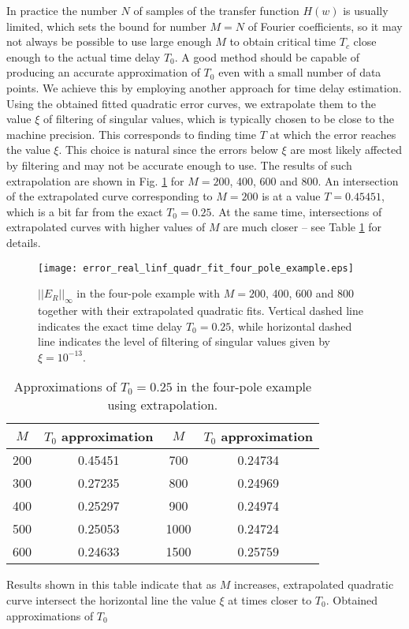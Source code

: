 \documentclass[journal,twoside]{IEEEtran}
\begin{document}
In practice the number $N$ of samples of the transfer function $H(w)$ is usually limited, which sets the bound for number $M=N$ of Fourier coefficients, so it may not always be possible to use large enough $M$ to obtain critical time $T_c$ close enough to the actual time delay $T_0$. A good method should be capable of producing an accurate approximation of $T_0$ even with a small number of data points. We achieve this by employing another approach for time delay estimation. Using the obtained   fitted quadratic error curves, we extrapolate them  to the value $\xi$ of filtering of singular values, which is typically chosen to be close to the machine precision. This corresponds to finding time $T$ at which the error reaches the value $\xi$. This choice is natural since the errors below $\xi$ are most likely affected by filtering and may not be accurate enough to use. The results of such extrapolation are shown in Fig. \ref{Ffour_pole3} for   $M=200$, 400, 600 and 800. An intersection of the extrapolated curve corresponding to $M=200$ is at a value $T=0.45451$, which is a bit far from the exact $T_0=0.25$. At the same time, intersections of extrapolated curves with higher values of $M$ are  much closer -- see  Table \ref{T0_extrapol_four_pole} for details. 
\begin{figure}[h] \begin{center}
\texttt{[image: error\_real\_linf\_quadr\_fit\_four\_pole\_example.eps]}
\end{center}
\caption{$||E_R||_\infty$ in the four-pole example with $M=200$, 400, 600 and 800  together with their extrapolated quadratic fits. Vertical dashed line indicates the exact time delay $T_0=0.25$, while horizontal dashed line indicates the level of filtering of singular values given by $\xi=10^{-13}$.}
\label{Ffour_pole3}
\end{figure}
\begin{table}[h]
\begin{center}
\begin{tabular}{|c|c||c|c|}
\hline
\rule{0cm}{10pt}
$M$ & $T_0$ approximation & $M$ & $T_0$ approximation  \\[3pt]
\hline
\rule{0cm}{10pt}
200 &    0.45451 & 700  & 0.24734  \\[3pt]
\hline
\rule{0cm}{10pt}  
300 &  0.27235  &   800  &  0.24969 \\[3pt]
\hline
\rule{0cm}{10pt}  
400  &  0.25297 & 900  & 0.24974 \\[3pt] 
\hline
\rule{0cm}{10pt}    
500  &  0.25053 & 1000  &  0.24724 \\
\hline
\rule{0cm}{10pt}    
600  &  0.24633 & 1500  &  0.25759 \\
\hline
\end{tabular}
\end{center}
\caption{Approximations of $T_0=0.25$ in the four-pole example using extrapolation.}
\label{T0_extrapol_four_pole}
\end{table}
Results shown in this  table 
indicate that as $M$ increases, extrapolated quadratic curve intersect the horizontal line the value $\xi$ at times closer to $T_0$.  Obtained approximations of $T_0$ 
 
\end{document}
